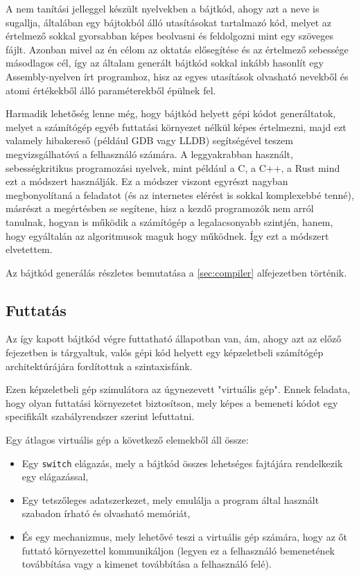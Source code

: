 A nem tanítási jelleggel készült nyelvekben a bájtkód, ahogy azt a neve is sugallja, általában egy bájtokból álló utasításokat tartalmazó kód, melyet az értelmező sokkal gyorsabban képes beolvasni és feldolgozni mint egy szöveges fájlt. Azonban mivel az én célom az oktatás elősegítése és az értelmező sebessége másodlagos cél, így az általam generált bájtkód sokkal inkább hasonlít egy Assembly-nyelven írt programhoz, hisz az egyes utasítások olvasható nevekből és atomi értékekből álló paraméterekből épülnek fel. 

Harmadik lehetőség lenne még, hogy bájtkód helyett gépi kódot generáltatok, melyet a számítógép egyéb futtatási környezet nélkül képes értelmezni, majd ezt valamely hibakereső (például GDB vagy LLDB) segítségével teszem megvizsgálhatóvá a felhasználó számára. A leggyakrabban használt, sebességkritikus programozási nyelvek, mint például a C, a C++, a Rust mind ezt a módszert használják. Ez a módszer viszont egyrészt nagyban megbonyolítaná a feladatot (és az internetes elérést is sokkal komplexebbé tenné), másrészt a megértésben se segítene, hisz a kezdő programozók nem arról tanulnak, hogyan is működik a számítógép a legalacsonyabb szintjén, hanem, hogy egyáltalán az algoritmusok maguk hogy működnek. Így ezt a módszert elvetettem.

Az bájtkód generálás részletes bemutatása a \ref{sec:compiler} alfejezetben történik.

\subsection{Futtatás}

Az így kapott bájtkód végre futtatható állapotban van, ám, ahogy azt az előző fejezetben is tárgyaltuk, valós gépi kód helyett egy képzeletbeli számítógép architektúrájára fordítottuk a szintaxisfánk.

Ezen képzeletbeli gép szimulátora az úgynezevett "virtuális gép". Ennek feladata, hogy olyan futtatási környezetet biztosítson, mely képes a bemeneti kódot egy specifikált szabályrendszer szerint lefuttatni.

Egy átlagos virtuális gép a következő elemekből áll össze:

\begin{itemize}
    \item Egy \texttt{switch} elágazás, mely a bájtkód összes lehetséges fajtájára rendelkezik egy elágazással,
    \item Egy tetszőleges adatszerkezet, mely emulálja a program által használt szabadon írható és olvasható memóriát,
    \item És egy mechanizmus, mely lehetővé teszi a virtuális gép számára, hogy az őt futtató környezettel kommunikáljon (legyen ez a felhasználó bemenetének továbbítása vagy a kimenet továbbítása a felhasználó felé).
\end{itemize}

